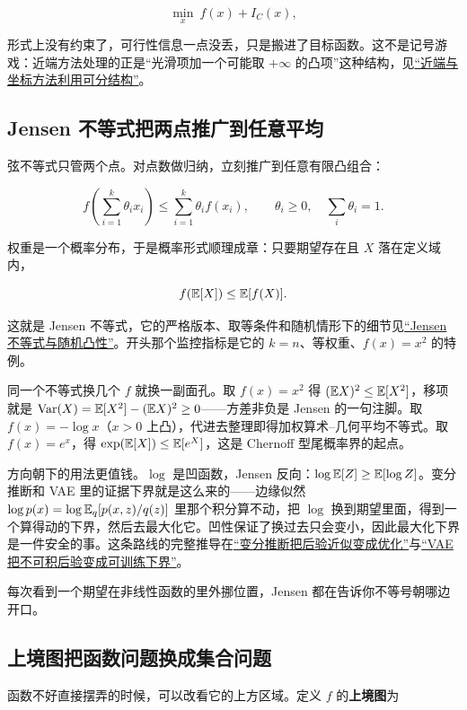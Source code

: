 \[
\min_x\ f(x)+I_C(x),
\]

形式上没有约束了，可行性信息一点没丢，只是搬进了目标函数。这不是记号游戏：近端方法处理的正是``光滑项加一个可能取 \(+\infty\) 的凸项''这种结构，见\hyperref[sec:09-Convex-Optimization/06-Optimization-Algorithms/04]{``近端与坐标方法利用可分结构''}。

\subsection{Jensen 不等式把两点推广到任意平均}

弦不等式只管两个点。对点数做归纳，立刻推广到任意有限凸组合：

\[
f\left(\sum_{i=1}^k\theta_i x_i\right)
\le
\sum_{i=1}^k\theta_i f(x_i),
\qquad
\theta_i\ge0,\quad\sum_i\theta_i=1.
\]

权重是一个概率分布，于是概率形式顺理成章：只要期望存在且 \(X\) 落在定义域内，

\[
f(\mathbb{E}[X])\le\mathbb{E}[f(X)].
\]

这就是 Jensen 不等式，它的严格版本、取等条件和随机情形下的细节见\hyperref[sec:05-Probability/07-Transforms-and-Bounds/03]{``Jensen 不等式与随机凸性''}。开头那个监控指标是它的 \(k=n\)、等权重、\(f(x)=x^2\) 的特例。

同一个不等式换几个 \(f\) 就换一副面孔。取 \(f(x)=x^2\) 得 \((\mathbb{E} X)^2\le\mathbb{E}[X^2]\)，移项就是 \(\operatorname{Var}(X)=\mathbb{E}[X^2]-(\mathbb{E} X)^2\ge0\)——方差非负是 Jensen 的一句注脚。取 \(f(x)=-\log x\)（\(x>0\) 上凸），代进去整理即得加权算术--几何平均不等式。取 \(f(x)=e^x\)，得 \(\exp(\mathbb{E}[X])\le\mathbb{E}[e^X]\)，这是 Chernoff 型尾概率界的起点。

方向朝下的用法更值钱。\(\log\) 是凹函数，Jensen 反向：\(\log\mathbb{E}[Z]\ge\mathbb{E}[\log Z]\)。变分推断和 VAE 里的证据下界就是这么来的——边缘似然 \(\log p(x)=\log\mathbb{E}_{q}[p(x,z)/q(z)]\) 里那个积分算不动，把 \(\log\) 换到期望里面，得到一个算得动的下界，然后去最大化它。凹性保证了换过去只会变小，因此最大化下界是一件安全的事。这条路线的完整推导在\hyperref[sec:13-Machine-Learning/08-Sampling-and-Inference/03]{``变分推断把后验近似变成优化''}与\hyperref[sec:14-Deep-Learning/06-Variational-Autoencoders/01]{``VAE 把不可积后验变成可训练下界''}。

每次看到一个期望在非线性函数的里外挪位置，Jensen 都在告诉你不等号朝哪边开口。

\subsection{上境图把函数问题换成集合问题}

函数不好直接摆弄的时候，可以改看它的上方区域。定义 \(f\) 的\textbf{上境图}为

